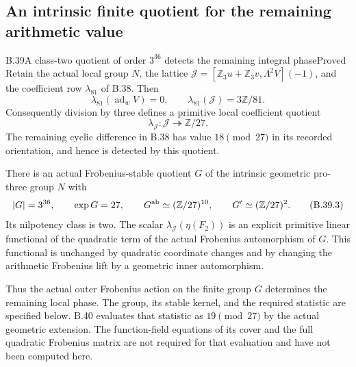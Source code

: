 \subsection{An intrinsic finite quotient for the remaining arithmetic value}

\begin{statement}{B.39}{A class-two quotient of order \(3^{36}\) detects the remaining integral phase}{Proved}
Retain the actual local group $N$, the lattice
$\mathcal J=[\mathbb Z_3u+\mathbb Z_3v,\Lambda^2V](-1)$,
and the coefficient row $\lambda_{81}$ of B.38.
Then
\[
 \lambda_{81}(\operatorname{ad}_wV)=0,
 \qquad
 \lambda_{81}(\mathcal J)=3\mathbb Z/81.
                                                               \tag{B.39.1}
\]
Consequently division by three defines a primitive
local coefficient quotient
\[
 \lambda_{\mathcal J}:\mathcal J\twoheadrightarrow\mathbb Z/27.
                                                               \tag{B.39.2}
\]
The remaining cyclic difference in B.38 has value
$18\pmod{27}$ in its recorded orientation, and hence
is detected by this quotient.

There is an actual Frobenius-stable quotient $G$ of
the intrinsic geometric pro-three group $N$ with
\[
 |G|=3^{36},\qquad \exp G=27,\qquad
 G^{\rm ab}\simeq(\mathbb Z/27)^{10},\qquad
 G'\simeq(\mathbb Z/27)^2.
                                                               \tag{B.39.3}
\]
Its nilpotency class is two. The scalar
$\lambda_{\mathcal J}(\eta(F_2))$ is an explicit
primitive linear functional of the quadratic term
of the actual Frobenius automorphism of $G$.
This functional is unchanged by quadratic coordinate
changes and by changing the arithmetic Frobenius lift
by a geometric inner automorphism.

Thus the actual outer Frobenius action on the finite
group $G$ determines the remaining local phase.
The group, its stable kernel, and the required statistic
are specified below. B.40 evaluates that statistic as
$19\pmod{27}$ by the actual geometric extension.
The function-field equations of its cover and the full
quadratic Frobenius matrix are not required for that
evaluation and have not been computed here.
\end{statement}
